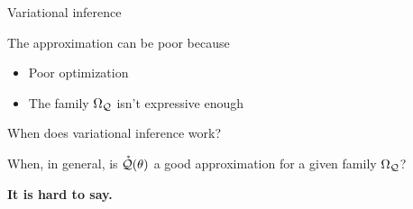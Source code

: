 \documentclass[8pt]{beamer}\usepackage[]{graphicx}\usepackage[]{color}
\begin{document}
\begin{frame}[t]{Variational inference \citep{blei:2016:variational}}
\begin{minipage}{0.55\textwidth}
The approximation can be poor because
%
\begin{itemize}
\item Poor optimization
\item The family $\Omega_{\mathcal{Q}}$ isn't expressive enough
\end{itemize}
%
%
\end{minipage}
\end{frame}




\begin{frame}{When does variational inference work?}

When, in general, is $\accentset{*}{\mathcal{Q}}(\theta)$ a good approximation for a given family $\Omega_{\mathcal{Q}}$?  

\vspace{1em}

\textbf{It is hard to say.}

\end{frame}


\end{document}
